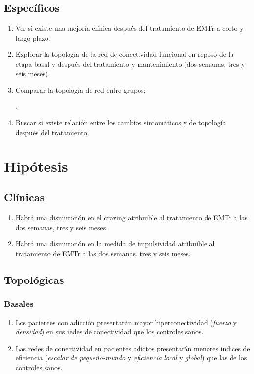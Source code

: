 \subsection{Específicos}
\begin{enumerate}[label=Específico \arabic*., left= \parindent]
    \item Ver si existe una mejoría clínica después del tratamiento de EMTr a corto y largo plazo.
    \item Explorar la topología de la red de conectividad funcional en reposo de la etapa basal y después del tratamiento y mantenimiento (dos semanas; tres y seis meses).
    \item Comparar la topología de red entre grupos: .
    \item Buscar si existe relación entre los cambios sintomáticos y de topología después del tratamiento.
\end{enumerate}

\section{Hipótesis}
\subsection{Clínicas}
\begin{enumerate}[label=Hipótesis \arabic*., left= \parindent]
    \item Habrá una disminución en el craving atribuible al tratamiento de EMTr a las dos semanas, tres y seis meses.
    \item Habrá una disminución en la medida de impulsividad atribuible al tratamiento de EMTr a las dos semanas, tres y seis meses.
\end{enumerate}
\subsection{Topológicas}
    \subsubsection{Basales}
    \begin{enumerate}[resume,label=Hipótesis \arabic*., left= \parindent]
        \item Los pacientes con adicción presentarán mayor hiperconectividad (\emph{fuerza} y \emph{densidad}) en sus redes de conectividad que los controles sanos.
        \item Las redes de conectividad en pacientes adictos presentarán menores índices de eficiencia (\emph{escalar de pequeño-mundo} y \emph{eficiencia local} y \emph{global}) que las de los controles sanos.
    \end{enumerate}
